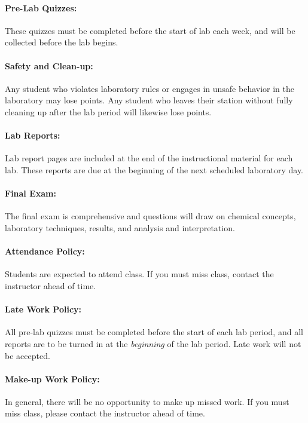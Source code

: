 \documentclass[12pt, letterpaper]{article}
\begin{document}
\paragraph{Pre-Lab Quizzes:}
These quizzes must be completed before the start of lab each week, and will be collected before the lab begins.

\paragraph{Safety and Clean-up:}
Any student who violates laboratory rules or engages in unsafe behavior in the laboratory may lose points. Any student who leaves their station without fully cleaning up after the lab period will likewise lose points.

\paragraph{Lab Reports:}
Lab report pages are included at the end of the instructional material for each lab. These reports are due at the beginning of the next scheduled laboratory day.

\paragraph{Final Exam:}
The final exam is comprehensive and questions will draw on chemical concepts, laboratory techniques, results, and analysis and interpretation. 

\paragraph{Attendance Policy:}
Students are expected to attend class. If you must miss class, contact the instructor ahead of time.

\paragraph{Late Work Policy:}
All pre-lab quizzes must be completed before the start of each lab period, and all reports are to be turned in at the \emph{beginning} of the lab period. Late work will not be accepted.

\paragraph{Make-up Work Policy:}
In general, there will be no opportunity to make up missed work. If you must miss class, please contact the instructor ahead of time.
\end{document}
